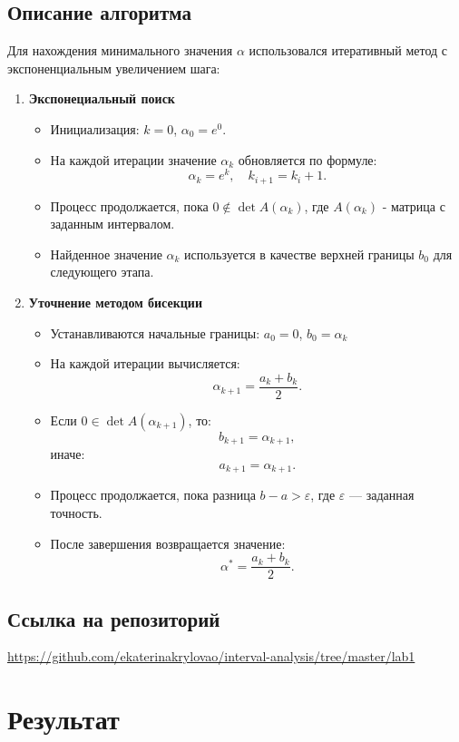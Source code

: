 \documentclass[a4paper,14pt]{article}
\begin{document}
	\subsection{Описание алгоритма}
	Для нахождения минимального значения \(\alpha\) использовался итеративный метод с экспоненциальным увеличением шага:
	\begin{enumerate}
		\item \textbf{Экспонециальный поиск}
		\begin{itemize}
			\item Инициализация: \( k = 0 \), \(\alpha_0 = e^0\).
			\item На каждой итерации значение \( \alpha_k \) обновляется по формуле:
          		\[ \alpha_k = e^k, \quad k_{i+1} = k_{i} + 1. \]
				  \item Процесс продолжается, пока \( 0 \notin \det A(\alpha_k) \), где \( A(\alpha_k) \) - матрица с заданным интервалом.
				  \item Найденное значение \( \alpha_k \) используется в качестве верхней границы \( b_0 \) для следующего этапа.
		\end{itemize}
		\item \textbf{Уточнение методом бисекции}
		\begin{itemize}
			\item Устанавливаются начальные границы: \( a_0 = 0 \), \( b_0 = \alpha_k \)
			\item На каждой итерации вычисляется:
				\[ \alpha_{k+1} = \frac{a_k + b_k}{2}. \]
			\item Если \( 0 \in \det A(\alpha_{k+1}) \), то:
				\[ b_{k+1} = \alpha_{k+1}, \]
			иначе:
				\[ a_{k+1} = \alpha_{k+1}. \]
			\item Процесс продолжается, пока разница \( b - a > \varepsilon \), где \( \varepsilon \) — заданная точность.
			\item После завершения возвращается значение:
				  \[ \alpha^* = \frac{a_k + b_k}{2}. \]	
		\end{itemize}
	\end{enumerate}
	
	\subsection{Ссылка на репозиторий}
	\url{https://github.com/ekaterinakrylovao/interval-analysis/tree/master/lab1}
	
	\clearpage

	\section{Результат}
\end{document}
